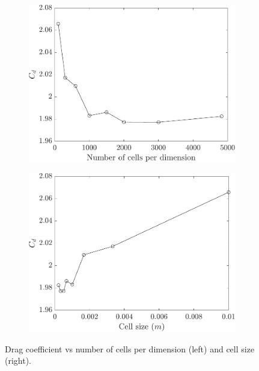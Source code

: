 \begin{figure}
    \centering
    \begin{subfigure}{0.49\textwidth}
        \centering
        \includegraphics[width=\textwidth]{Images/3. Methodology/Mesh convergence/cdnc.pdf}
    \end{subfigure}
    \hfill
    \begin{subfigure}{0.49\textwidth}
        \centering
        \includegraphics[width=\textwidth]{Images/3. Methodology/Mesh convergence/cdcs.pdf}
    \end{subfigure}
    \caption{Drag coefficient vs number of cells per dimension (left) and cell size (right).}
    \label{fig:meshcd}
\end{figure}

